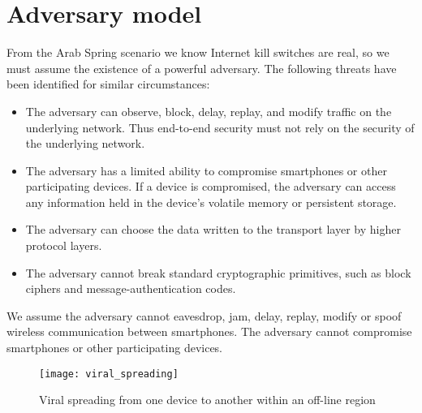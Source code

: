 \section{Adversary model}\label{sec:adversary_model}
From the Arab Spring scenario we know Internet kill switches are real, so we must assume the existence of a powerful adversary.
The following threats \cite{ietf-shadow-internet} have been identified for similar circumstances:
\begin{itemize}
\item{
	The adversary can observe, block, delay, replay, and modify traffic on the underlying network.
	Thus end-to-end security must not rely on the security of the underlying network.
}
\item{
	The adversary has a limited ability to compromise smartphones or other participating devices.
	If a device is compromised, the adversary can access any information held in the device's volatile memory or persistent storage.
}
\item{
	The adversary can choose the data written to the transport layer by higher protocol layers.
}
\item{
	The adversary cannot break standard cryptographic primitives, such as block ciphers and message-authentication codes.
}
\end{itemize}
We assume the adversary cannot eavesdrop, jam, delay, replay, modify or spoof wireless communication between smartphones.
The adversary cannot compromise smartphones or other participating devices.

\begin{figure}[H]
	\centering
	\texttt{[image: viral\_spreading]}
	\caption{Viral spreading from one device to another within an off-line region}
	\label{fig:viral_spreading}
\end{figure}



